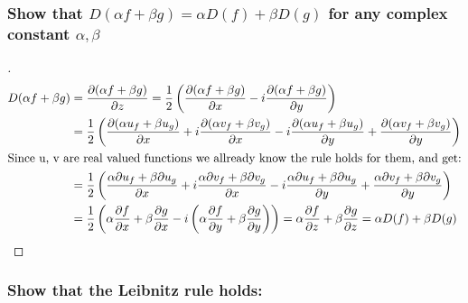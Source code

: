 \documentclass{article}
\begin{document}
  \subsubsection*{Show that $D(\alpha f + \beta g) = \alpha D(f) + \beta D(g)$ for any complex constant $\alpha, \beta$}

  \begin{proof}[\unskip\nopunct]
    \begin{align*}D(\alpha f + \beta g) &= \frac{\partial (\alpha f + \beta g)}{\partial z} = \frac{1}{2}\left(\frac{\partial (\alpha f + \beta g)}{\partial x} - i\frac{\partial (\alpha f + \beta g)}{\partial y} \right)  \\
      &=  \frac{1}{2}\left(\frac{\partial (\alpha u_f + \beta u_g)}{\partial x}  + i \frac{\partial (\alpha v_f + \beta v_g)}{\partial x} - i\frac{\partial (\alpha u_f + \beta u_g)}{\partial y}  + \frac{\partial (\alpha v_f + \beta v_g)}{\partial y} \right)\\
      \intertext{Since u, v are real valued functions we allready know the rule holds for them, and get:}
      &= \frac{1}{2}\left(\frac{\alpha\partial u_f + \beta\partial u_g}{\partial x} + i\frac{\alpha\partial v_f + \beta\partial v_g}{\partial x}  -i\frac{\alpha\partial u_f + \beta\partial u_g}{\partial y} + \frac{\alpha\partial v_f + \beta\partial v_g}{\partial y}\right) \\
      &=\frac{1}{2}\left(\alpha\frac{\partial f}{\partial x} + \beta\frac{\partial g}{\partial x} -i\left( \alpha\frac{\partial f}{\partial y} + \beta\frac{\partial g}{\partial y} \right)\right) = \alpha \frac{\partial f}{\partial z} + \beta \frac{\partial g}{\partial z} = \alpha D(f) + \beta D(g)
    \end{align*}
  \end{proof}

  \subsubsection*{Show that the Leibnitz rule holds:}
\end{document}
